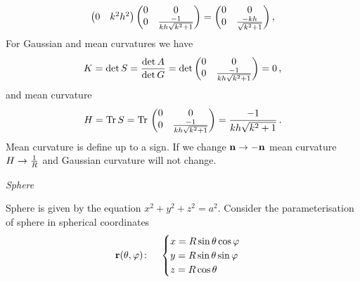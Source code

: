 \documentclass[12pt]{article}
\theoremstyle{theorem}
\numberwithin{equation}{section}
\begin{document}
{$$\begin{pmatrix}
                                0&k^2h^2\cr
                                   \end{pmatrix}
                                   \begin{pmatrix}0&0\cr
                                0&{-1\over kh\sqrt {k^2+1}}\cr
                                   \end{pmatrix}=
                                   \begin{pmatrix}0&0\cr
                                0&{-kh\over \sqrt {k^2+1}}\cr
                                   \end{pmatrix},
                    $$
For Gaussian and mean curvatures we have
     \begin{equation}\label{Gaussianforcylinder}
        K=\det S={\det A\over \det G}=\det
                              \begin{pmatrix}0&0\cr
                                0&{-1\over kh\sqrt {k^2+1}}\cr
                                   \end{pmatrix}=0\,,
     \end{equation}
     and mean curvature
      \begin{equation}\label{meanianforcylinder}
        H={\rm Tr\,} S={\rm Tr\,}
                              \begin{pmatrix}0&0\cr
                                0&{-1\over kh\sqrt {k^2+1}}\cr
                                   \end{pmatrix}={-1\over kh\sqrt {k^2+1}}\,.
     \end{equation}
Mean curvature is define up to a sign. If we change ${\bf n}\to-{\bf n}$ mean curvature $H\to {1\over R}$ and Gaussian curvature
will not change.


\bigskip




{\it Sphere}


\medskip


  Sphere is given by the equation $x^2+y^2+z^2=a^2$. Consider the  parameterisation
 of sphere in spherical coordinates
\begin{equation}\label{surfacesphere11}
  {\bf r}(\theta,\varphi)\colon\quad
  \begin{cases}
  x=R\sin\theta\cos\varphi\\
  y=R\sin\theta\sin\varphi\\
  z=R\cos\theta\\
  \end{cases}
\end{equation}

}
\end{document}
